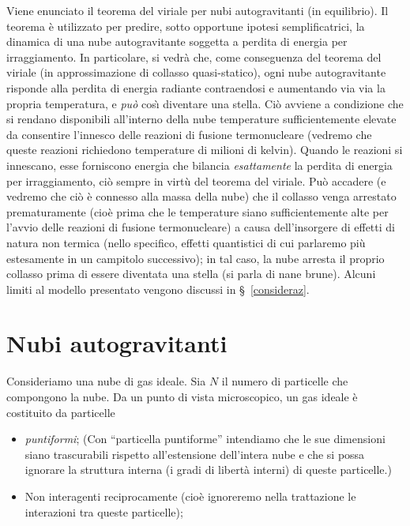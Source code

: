 

\label{nascita}
\minitoc\mtcskip


\noindent Viene enunciato il teorema del viriale per nubi autogravitanti (in
equilibrio). Il teorema \`e utilizzato per predire, sotto opportune ipotesi
semplificatrici, la dinamica di una nube autogravitante soggetta a perdita di
energia per irraggiamento. In particolare, si vedr\`a che, come conseguenza del
teorema del viriale (in approssimazione di collasso quasi-statico), ogni nube
autogravitante risponde alla perdita di energia radiante contraendosi e
aumentando via via la propria temperatura, e \emph{pu\`o} cos\`{\i} diventare
una stella.  Ci\`o avviene a condizione che si rendano disponibili all'interno
della nube temperature sufficientemente elevate da consentire l'innesco delle
reazioni di fusione termonucleare (vedremo che queste reazioni richiedono
temperature di milioni di kelvin). Quando le reazioni si innescano, esse
forniscono energia che bilancia \emph{esattamente} la perdita di energia per
irraggiamento, ci\`o sempre in virt\`u del teorema del viriale. Pu\`o accadere
(e vedremo che ci\`o \`e connesso alla massa della nube) che il collasso venga
arrestato prematuramente (cio\`e prima che le temperature siano sufficientemente
alte per l'avvio delle reazioni di fusione termonucleare) a causa dell'insorgere
di effetti di natura non termica (nello specifico, effetti quantistici di cui
parlaremo pi\`u estesamente in un campitolo successivo); in tal caso, la nube
arresta il proprio collasso prima di essere diventata una stella (si parla di
nane brune). Alcuni limiti al modello presentato vengono discussi in
\S~\ref{consideraz}.

\section{Nubi autogravitanti}\label{sec:viriale}

Consideriamo una nube di gas ideale.
Sia $N$ il numero di particelle che compongono la nube.
Da un punto di vista microscopico,  un gas ideale  \`e costituito da particelle 
\begin{itemize}
   \item \emph{puntiformi};
(Con ``particella puntiforme'' intendiamo che le sue dimensioni siano
trascurabili rispetto all'estensione dell'intera nube e che si possa ignorare
la struttura interna (i gradi di libert\`a interni) di queste particelle.)
\item Non interagenti reciprocamente (cio\`e
   ignoreremo nella trattazione le interazioni tra queste particelle);
\end{itemize}


